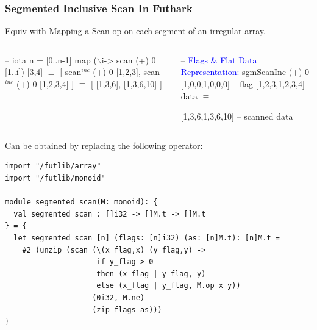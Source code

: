 \documentclass{beamer}
\newcommand{\blue}[1]{\textcolor{Blue}{{#1}}}
\renewcommand{\emph}[1]{\textcolor{structure}{#1}}
\newcommand{\emp}[1]{\textcolor{DikuRed}{ #1}}
\newcommand{\emphh}[1]{\textcolor{CosGreen}{ #1}}
\newcommand{\mymath}[1]{$ #1 $}
\newcommand{\myindu}[1]{^{#1}}
\begin{document}
\begin{frame}[fragile,t]
  \frametitle{Segmented Inclusive Scan In Futhark}

\emphh{Equiv with Mapping a Scan op on each segment of an irregular array.}

\begin{columns}
\begin{colorcode}
-- iota n = [0..n-1]
map (\mymath{\backslash}i-> scan (+) 0 [1..i]) [3,4] \emph{\mymath{\equiv}}
[ scan\mymath{\myindu{inc}} (+) 0 [1,2,3], 
  scan\mymath{\myindu{inc}} (+) 0 [1,2,3,4] ] 
      \emph{\mymath{\equiv}}
[ [1,3,6], [1,3,6,10] ]
\end{colorcode}
\begin{colorcode}
-- \blue{Flags \& Flat Data Representation:}
sgmScanInc (+) 0 [1,0,0,1,0,0,0] -- \emph{flag}
                 [1,2,3,1,2,3,4] -- \emp{data}
    \emph{\mymath{\equiv}}

  [1,3,6,1,3,6,10]        -- \emp{scanned data}
\end{colorcode}
\end{columns}
\medskip



\emphh{Can be obtained by replacing the following operator:}
\smallskip

\lstset{basicstyle=\scriptsize}
  \begin{lstlisting}
import "/futlib/array"
import "/futlib/monoid"

module segmented_scan(M: monoid): {
  val segmented_scan : []i32 -> []M.t -> []M.t
} = {
  let segmented_scan [n] (flags: [n]i32) (as: [n]M.t): [n]M.t =
    #2 (unzip (scan (\(x_flag,x) (y_flag,y) ->
                     if y_flag > 0
                     then (x_flag | y_flag, y)
                     else (x_flag | y_flag, M.op x y))
                    (0i32, M.ne)
                    (zip flags as)))
}
  \end{lstlisting}
\lstset{basicstyle=\small}

%
%
%
%
\end{frame}
\end{document}
